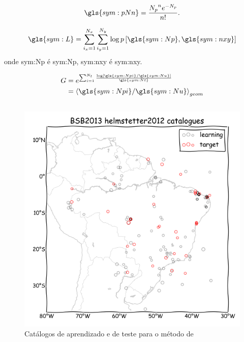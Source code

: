 \documentclass[final]{beamer}
\begin{document}
\begin{poster}
\newcolumn


\small
		\begin{equation}
			\ensuremath{
				\gls{sym:pNn} = \frac{{N_p}^n e^{-N_p}}{n!}.
			}
			\label{eq:loglik}
		\end{equation}

		\begin{equation}
			\ensuremath{
				\gls{sym:L} = \sum_{i_x=1}^{N_x}\sum_{i_y=1}^{N_y}\log p\left[  \gls{sym:Np}, \gls{sym:nxy}  \right]
			}
			\label{eq:loglik}
		\end{equation}
\footnotesize
	onde \gls{sym:Np} é \glsdesc{sym:Np},
		\gls{sym:nxy} é \glsdesc{sym:nxy}.

\small
		\begin{equation}
			\ensuremath{
			\begin{align}
				G & = e^{\sum_{i = 1}^{N_t}
							\frac{\log \left[  \gls{sym:Npi} / \gls{sym:Nu}  \right]}
								 {\gls{sym:Nt}}
					  } \\
				  & = {\langle  \gls{sym:Npi} / \gls{sym:Nu}  \rangle}_{geom}
			\end{align}}
			\label{eq:G}
		\end{equation}	

\vspace{0.3cm}
\begin{columns}[c,totalwidth=\textwidth]

\begin{figure}[H]
  \centering
  \includegraphics[width=.98\textwidth]{helmstetter_catalogues} 
  \caption{Catálogos de aprendizado e de teste para o método de \citet{helmstetter_2012}}
  \label{fig:h_catalogue} 
\end{figure}


\end{columns}
\end{poster}
\end{document}
